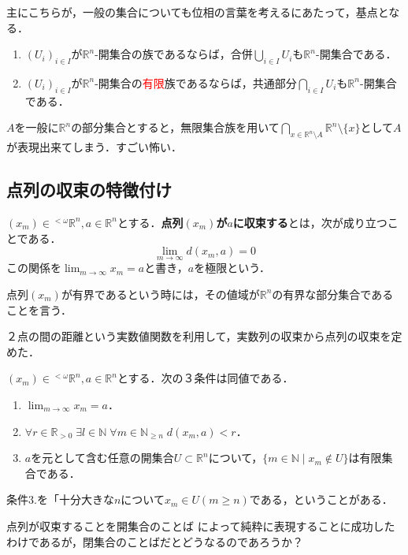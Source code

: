 \documentclass[uplatex,dvipdfmx]{jsreport}
\begin{document}
主にこちらが，一般の集合についても位相の言葉を考えるにあたって，基点となる．
\begin{proposition}[開集合の性質]\mbox{}
    \begin{enumerate}
        \item $(U_i)_{i\in I}$が$\mathbb{R}^n$-開集合の族であるならば，合併$\bigcup_{i\in I}U_i$も$\mathbb{R}^n$-開集合である．
        \item $(U_i)_{i\in I}$が$\mathbb{R}^n$-開集合の\textcolor{red}{有限}族であるならば，共通部分$\bigcap_{i\in I}U_i$も$\mathbb{R}^n$-開集合である．
    \end{enumerate}
\end{proposition}
\begin{remark}
    $A$を一般に$\mathbb{R}^n$の部分集合とすると，無限集合族を用いて$\bigcap_{x\in\mathbb{R}^n\setminus A}\mathbb{R}^n\setminus\{x\}$として$A$が表現出来てしまう．すごい怖い．
\end{remark}

\subsection{点列の収束の特徴付け}

\begin{definition}[点列の収束]
    $(x_m)\in{}^{<\omega}\mathbb{R}^n,a\in\mathbb{R}^n$とする．\textbf{点列$(x_m)$が$a$に収束する}とは，次が成り立つことである．
    \[ \lim_{m\to\infty}d(x_m,a)=0 \]
    この関係を$\lim_{m\to\infty}x_m=a$と書き，$a$を極限という．

    点列$(x_m)$が有界であるという時には，その値域が$\mathbb{R}^n$の有界な部分集合であることを言う．
\end{definition}
\begin{remark}
    ２点の間の距離という実数値関数を利用して，実数列の収束から点列の収束を定めた．
\end{remark}

\begin{proposition}[点列の収束の位相的特徴付け]
    $(x_m)\in{}^{<\omega}\mathbb{R}^n, a\in\mathbb{R}^n$とする．次の３条件は同値である．
    \begin{enumerate}
        \item $\lim_{m\to\infty}x_m=a$．
        \item $\forall r\in\mathbb{R}_{>0}\;\exists l\in\mathbb{N}\;\forall m\in\mathbb{N}_{\ge n}\; d(x_m,a)<r$．
        \item $a$を元として含む任意の開集合$U\subset\mathbb{R}^n$について，$\{m\in\mathbb{N}\mid x_m\notin U\}$は有限集合である．
    \end{enumerate}
    条件3.を「十分大きな$n$について$x_m\in U (m\ge n)$である，ということがある．
\end{proposition}
\begin{remark}
    点列が収束することを開集合のことば
    によって純粋に表現することに成功したわけであるが，閉集合のことばだとどうなるのであろうか？
\end{remark}
\end{document}
